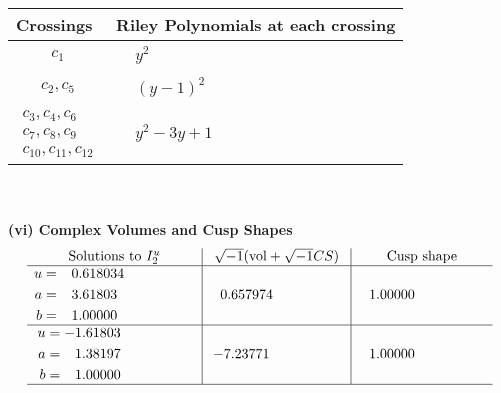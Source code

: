 \documentclass[1p]{elsarticle_modified}
\theoremstyle{definition}
\newcommand{\I}{\sqrt{-1}}
\begin{document}
\begin{tabular}{m{50pt}|m{274pt}}
Crossings & \hspace{64pt}Riley Polynomials at each crossing \\
\hline $$\begin{aligned}c_{1}\end{aligned}$$&$\begin{aligned}
&y^2
\end{aligned}$\\
\hline $$\begin{aligned}c_{2},c_{5}\end{aligned}$$&$\begin{aligned}
&(y-1)^2
\end{aligned}$\\
\hline $$\begin{aligned}c_{3},c_{4},c_{6}\\c_{7},c_{8},c_{9}\\c_{10},c_{11},c_{12}\end{aligned}$$&$\begin{aligned}
&y^2-3 y+1
\end{aligned}$\\
\hline
\end{tabular}\\~\\
\newpage\flushleft \textbf{(vi) Complex Volumes and Cusp Shapes}
$$\begin{array}{c|c|c}  
\text{Solutions to }I^u_{2}& \I (\text{vol} + \sqrt{-1}CS) & \text{Cusp shape}\\
 \hline 
\begin{aligned}
u &= \phantom{-}0.618034\phantom{ +0.000000I} \\
a &= \phantom{-}3.61803\phantom{ +0.000000I} \\
b &= \phantom{-}1.00000\phantom{ +0.000000I}\end{aligned}
 & \phantom{-}0.657974\phantom{ +0.000000I} & \phantom{-}1.00000\phantom{ +0.000000I} \\ \hline\begin{aligned}
u &= -1.61803\phantom{ +0.000000I} \\
a &= \phantom{-}1.38197\phantom{ +0.000000I} \\
b &= \phantom{-}1.00000\phantom{ +0.000000I}\end{aligned}
 & -7.23771\phantom{ +0.000000I} & \phantom{-}1.00000\phantom{ +0.000000I}\\
 \hline 
 \end{array}$$\newpage
\newpage\renewcommand{\arraystretch}{1}
\end{document}
